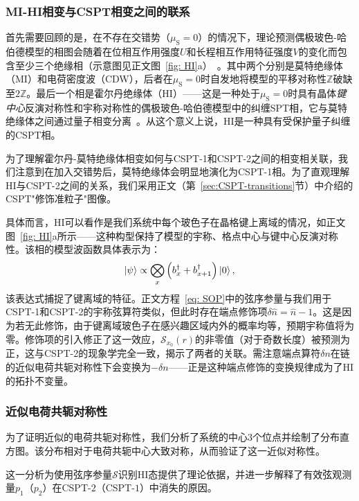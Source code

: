 \documentclass[preprint,superscriptaddress,floatfix, nofootinbib]{revtex4-2}
\begin{document}
\begin{CJK*}{UTF8}{gbsn}
\subsubsection*{MI-HI相变与CSPT相变之间的联系}

首先需要回顾的是，在不存在交错势（$\mu_{\text{S}} = 0$）的情况下，理论预测偶极玻色-哈伯德模型的相图会随着在位相互作用强度$U$和长程相互作用特征强度$V$的变化而包含至少三个绝缘相（示意图见正文图~\ref{fig: HI}a）~\cite{Torre2006, Berg2008}。其中两个分别是莫特绝缘体（MI）和电荷密度波（CDW），后者在$\mu_{\text{S}} = 0$时自发地将模型的平移对称性$\mathbb{Z}$破缺至$2\mathbb{Z}$。最后一个相是霍尔丹绝缘体（HI）——这是一种处于$\mu_{\text{S}} = 0$时具有晶体\textit{键中心}反演对称性和宇称对称性的偶极玻色-哈伯德模型中的纠缠SPT相，它与莫特绝缘体之间通过量子相变分离~\cite{Pollmann2010}。从这个意义上说，HI是一种具有受保护量子纠缠的CSPT相。

为了理解霍尔丹-莫特绝缘体相变如何与CSPT-1和CSPT-2之间的相变相关联\cite{Sahay2025}，我们注意到在加入交错势后，莫特绝缘体会明显地演化为CSPT-1相。为了直观理解HI与CSPT-2之间的关系，我们采用正文（第~\ref{sec:CSPT-transitions}节）中介绍的CSPT"修饰准粒子"图像。

具体而言，HI可以看作是我们系统中每个玻色子在晶格键上离域的情况，如正文图~\ref{fig: HI}a所示——这种构型保持了模型的宇称、格点中心与键中心反演对称性。该相的模型波函数具体表示为：
\begin{equation} \label{eq:model-wavefunction}
    \ket{\psi} \propto \bigotimes_{x} \left( b_{x}^{\dagger} + b_{x + 1}^{\dagger} \right) \ket{0},
\end{equation}
该表达式捕捉了键离域的特征。正文方程~\eqref{eq: SOP}中的弦序参量与我们用于CSPT-1和CSPT-2的宇称弦算符类似，但此时存在端点修饰项$\delta \hat n = \hat n-1$。这是因为若无此修饰，由于键离域玻色子在感兴趣区域内外的概率均等，预期宇称值将为零。修饰项的引入修正了这一效应，$\mathcal{S}_{x_0} (r)$的非零值（对于奇数长度）被预测为正，这与CSPT-2的现象学完全一致，揭示了两者的关联。需注意端点算符$\delta n$在链的近似电荷共轭对称性下会变换为$-\delta n$——正是这种端点修饰的变换规律成为了HI的拓扑不变量\cite{Pollmann2012, Schuch2011, Chen2011}。
\subsubsection*{近似电荷共轭对称性}
为了证明近似的电荷共轭对称性，我们分析了系统的中心3个位点并绘制了分布直方图。该分布相对于电荷共轭中心大致对称，从而验证了这一近似对称性。

这一分析为使用弦序参量$\mathcal{S}$识别HI态提供了理论依据，并进一步解释了有效弦观测量$p_1$（$p_2$）在CSPT-$2$（CSPT-$1$）中消失的原因。

\end{CJK*}
\end{document}
